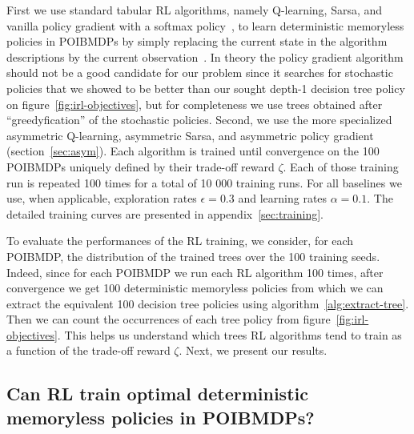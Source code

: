 First we use standard tabular RL algorithms, namely Q-learning, Sarsa, and vanilla policy gradient with a softmax policy~\citep{watkins1992q,sutton,jsj}, to learn deterministic memoryless policies in POIBMDPs by simply replacing the current state in the algorithm descriptions by the current observation~\citep{sarsa-pomdp}.
In theory the policy gradient algorithm should not be a good candidate for our problem since it searches for stochastic policies that we showed to be better than our sought depth-1 decision tree policy on figure~\ref{fig:irl-objectives}, but for completeness we use trees obtained after ``greedyfication'' of the stochastic policies.
Second, we use the more specialized asymmetric Q-learning, asymmetric Sarsa, and asymmetric policy gradient (section~\ref{sec:asym}).
Each algorithm is trained until convergence on the 100 POIBMDPs uniquely defined by their trade-off reward $\zeta$. Each of those training run is repeated 100 times for a total of 10 000 training runs.
For all baselines we use, when applicable, exploration rates $\epsilon=0.3$ and learning rates $\alpha=0.1$.
The detailed training curves are presented in appendix~\ref{sec:training}.

To evaluate the performances of the RL training, we consider, for each POIBMDP, the distribution of the trained trees over the 100 training seeds.
Indeed, since for each POIBMDP we run each RL algorithm 100 times, after convergence we get 100 deterministic memoryless policies from which we can extract the equivalent 100 decision tree policies using algorithm~\ref{alg:extract-tree}.
Then we can count the occurrences of each tree policy from figure~\ref{fig:irl-objectives}.
This helps us understand which trees RL algorithms tend to train as a function of the trade-off reward $\zeta$. Next, we present our results.


\subsection{Can RL train optimal deterministic memoryless policies in POIBMDPs?}\label{sec:experiments}

